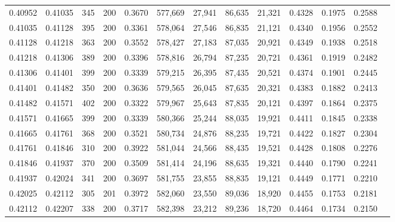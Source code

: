 \begin{tabular}{rrrrrrrrrrrrr}
0.40952 & 0.41035 &   345 & 200 &                                     0.3670 & 577,669 &  27,941 &  86,635 &  21,321 & 0.4328 & 0.1975 & 0.2588 \\
0.41035 & 0.41128 &   395 & 200 &                                     0.3361 & 578,064 &  27,546 &  86,835 &  21,121 & 0.4340 & 0.1956 & 0.2552 \\
0.41128 & 0.41218 &   363 & 200 &                                     0.3552 & 578,427 &  27,183 &  87,035 &  20,921 & 0.4349 & 0.1938 & 0.2518 \\
0.41218 & 0.41306 &   389 & 200 &                                     0.3396 & 578,816 &  26,794 &  87,235 &  20,721 & 0.4361 & 0.1919 & 0.2482 \\
0.41306 & 0.41401 &   399 & 200 &                                     0.3339 & 579,215 &  26,395 &  87,435 &  20,521 & 0.4374 & 0.1901 & 0.2445 \\
0.41401 & 0.41482 &   350 & 200 &                                     0.3636 & 579,565 &  26,045 &  87,635 &  20,321 & 0.4383 & 0.1882 & 0.2413 \\
0.41482 & 0.41571 &   402 & 200 &                                     0.3322 & 579,967 &  25,643 &  87,835 &  20,121 & 0.4397 & 0.1864 & 0.2375 \\
0.41571 & 0.41665 &   399 & 200 &                                     0.3339 & 580,366 &  25,244 &  88,035 &  19,921 & 0.4411 & 0.1845 & 0.2338 \\
0.41665 & 0.41761 &   368 & 200 &                                     0.3521 & 580,734 &  24,876 &  88,235 &  19,721 & 0.4422 & 0.1827 & 0.2304 \\
0.41761 & 0.41846 &   310 & 200 &                                     0.3922 & 581,044 &  24,566 &  88,435 &  19,521 & 0.4428 & 0.1808 & 0.2276 \\
0.41846 & 0.41937 &   370 & 200 &                                     0.3509 & 581,414 &  24,196 &  88,635 &  19,321 & 0.4440 & 0.1790 & 0.2241 \\
0.41937 & 0.42024 &   341 & 200 &                                     0.3697 & 581,755 &  23,855 &  88,835 &  19,121 & 0.4449 & 0.1771 & 0.2210 \\
0.42025 & 0.42112 &   305 & 201 &                                     0.3972 & 582,060 &  23,550 &  89,036 &  18,920 & 0.4455 & 0.1753 & 0.2181 \\
0.42112 & 0.42207 &   338 & 200 &                                     0.3717 & 582,398 &  23,212 &  89,236 &  18,720 & 0.4464 & 0.1734 & 0.2150 \\

\end{tabular}
